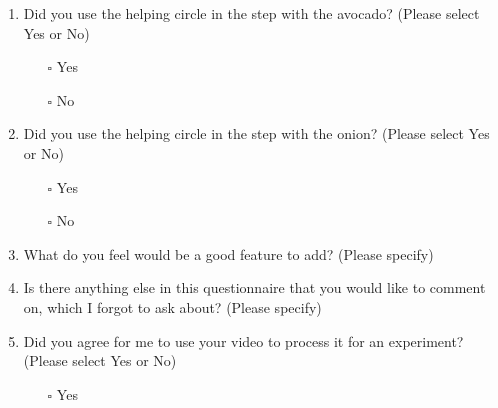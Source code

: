 \begin{enumerate}
    \item Did you use the helping circle in the step with the avocado? (Please select Yes or No)\\
    \begin{itemize}
        \item[$\square$] Yes
        \item[$\square$] No
    \end{itemize}
    
    \item Did you use the helping circle in the step with the onion? (Please select Yes or No)\\
    \begin{itemize}
        \item[$\square$] Yes
        \item[$\square$] No
    \end{itemize}
    
    \item What do you feel would be a good feature to add? (Please specify)
    
    \item Is there anything else in this questionnaire that you would like to comment on, which I forgot to ask about? (Please specify)
    
    \item Did you agree for me to use your video to process it for an experiment? (Please select Yes or No)\\
    \begin{itemize}
        \item[$\square$] Yes
    \end{itemize}
\end{enumerate}